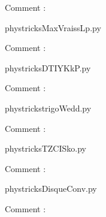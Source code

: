     Comment : 

    \clearpage
    


    \newcommand{\CaptionFigMaxVraissLp}{<+Type your caption here+>}
    \begin{center}
        
    \end{center}
    phystricksMaxVraissLp.py

    Comment : 

    \clearpage
    


    \newcommand{\CaptionFigDTIYKkP}{<+Type your caption here+>}
    \begin{center}
        
    \end{center}
    phystricksDTIYKkP.py

    Comment : 

    \clearpage
    


    \newcommand{\CaptionFigtrigoWedd}{<+Type your caption here+>}
    \begin{center}
        
    \end{center}
    phystrickstrigoWedd.py

    Comment : 

    \clearpage
    


    \newcommand{\CaptionFigTZCISko}{<+Type your caption here+>}
    \begin{center}
        
    \end{center}
    phystricksTZCISko.py

    Comment : 

    \clearpage
    


    \newcommand{\CaptionFigDisqueConv}{<+Type your caption here+>}
    \begin{center}
        
    \end{center}
    phystricksDisqueConv.py

    Comment : 

    \clearpage
    


